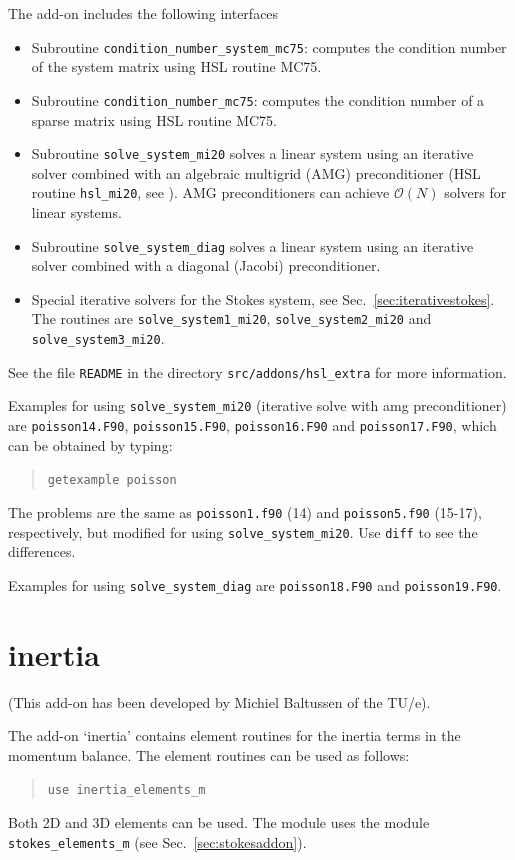 The add-on includes the following interfaces \begin{itemize}
   \item Subroutine \texttt{condition\_number\_system\_mc75}: computes the
condition number of the system matrix using HSL routine MC75.
   \item Subroutine \texttt{condition\_number\_mc75}: computes the
condition number of a sparse matrix using HSL routine MC75.
   \item Subroutine \texttt{solve\_system\_mi20} solves a linear system using
an iterative solver combined with an algebraic multigrid (AMG) preconditioner
(HSL routine \texttt{hsl\_mi20}, see \cite{Doyle07}).
AMG preconditioners can achieve $\mathcal{O}(N)$ solvers for linear systems.
   \item Subroutine \texttt{solve\_system\_diag} solves a linear system using
an iterative solver combined with a diagonal (Jacobi) preconditioner.
    \item Special iterative solvers for the Stokes system, see Sec.~\ref{sec:iterativestokes}. The routines are
 \texttt{solve\_system1\_mi20}, \texttt{solve\_system2\_mi20} and \texttt{solve\_system3\_mi20}.
\end{itemize}
See the file \texttt{README} in the directory
\texttt{src/addons/hsl\_extra} for more information.

Examples for using  \texttt{solve\_system\_mi20}
 (iterative solve with amg
preconditioner) are
\texttt{poisson14.F90}, \texttt{poisson15.F90}, \texttt{poisson16.F90}
and \texttt{poisson17.F90}, which can be obtained by
typing:
\begin{quote}
   \texttt{getexample poisson}
\end{quote}
The problems are
the same as \texttt{poisson1.f90} (14) and \texttt{poisson5.f90} (15-17),
respectively,
but modified for using \texttt{solve\_system\_mi20}.
Use \texttt{diff} to see the differences.

Examples for using \texttt{solve\_system\_diag} are \texttt{poisson18.F90} and
 \texttt{poisson19.F90}.

\section{inertia}
\label{sec:inertia}

(This add-on has been developed by Michiel Baltussen of the TU/e).

The add-on `inertia' contains element routines for the inertia terms
in the momentum balance.
The element routines can be used as follows:
\begin{quote}
   \texttt{use inertia\_elements\_m}
\end{quote}
Both 2D and 3D elements can be used.
The module uses the module \texttt{stokes\_elements\_m}
(see Sec.~\ref{sec:stokesaddon}).

